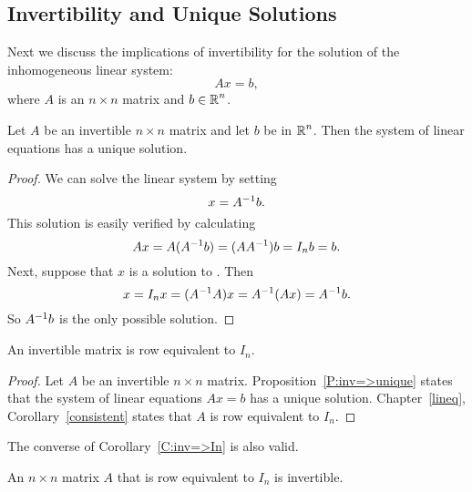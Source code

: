 \documentclass{ximera}
\begin{document}
\subsection*{Invertibility and Unique Solutions}

Next we discuss the implications of invertibility for the
solution of the inhomogeneous linear system:  
\begin{equation}  \label{squarematrix}
Ax=b,
\end{equation}
where $A$ is an $n\times n$ matrix and $b\in\mbox{$\Bbb{R}$}^n$.

\begin{proposition} \label{P:inv=>unique}
Let $A$ be an invertible $n\times n$ matrix and let $b$ be in $\mbox{$\Bbb{R}$}^n$.
Then the system of linear equations  has a unique solution.
\end{proposition}

\begin{proof}  We can solve the linear system  by setting
\begin{equation}  \label{soln}
x=A^{-1} b.
\end{equation}
This solution is easily verified by calculating
\[
Ax=A(A^{-1} b) = (AA^{-1})b = I_nb = b.
\]
Next, suppose that $x$ is a solution to .  Then
\[
x = I_n x = (A^{-1} A)x = A^{-1}(Ax) = A^{-1} b.
\]
So $A^{-1} b$ is the only possible solution.  \end{proof}

\begin{corollary} \label{C:inv=>In}
An invertible matrix is row equivalent to $I_n$.
\end{corollary}

\begin{proof}  Let $A$ be an invertible $n\times n$ matrix.
Proposition~\ref{P:inv=>unique} states that the system of linear equations
$Ax=b$ has a unique solution.  Chapter~\ref{lineq}, Corollary~\ref{consistent}
states that $A$ is row equivalent to $I_n$.  \end{proof}

The converse of Corollary~\ref{C:inv=>In} is also valid.

\begin{proposition}  \label{P:row=>inv}
An $n\times n$ matrix $A$ that is row equivalent to $I_n$ is invertible.
\end{proposition}
\end{document}
